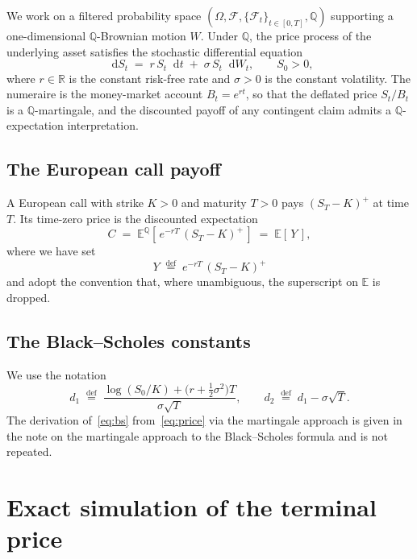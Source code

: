 \documentclass[11pt,a4paper]{article}
\theoremstyle{plain}
\theoremstyle{definition}
\theoremstyle{remark}
\newcommand{\R}{\mathbb{R}}
\newcommand{\E}{\mathbb{E}}
\newcommand{\F}{\mathcal{F}}
\newcommand{\Q}{\mathbb{Q}}
\newcommand{\dd}{\mathop{}\!\mathrm{d}}
\newcommand{\eqdef}{\overset{\mathrm{def}}{=}}
\begin{document}
We work on a filtered probability space
$(\Omega, \F, \{\F_t\}_{t \in [0,T]}, \Q)$ supporting a one-dimensional
$\Q$-Brownian motion $W$. Under $\Q$, the price process of the
underlying asset satisfies the stochastic differential equation
\begin{equation}
\label{eq:gbm-sde}
\dd S_t \;=\; r\, S_t \dd t \;+\; \sigma\, S_t \dd W_t,
\qquad S_0 > 0,
\end{equation}
where $r \in \R$ is the constant risk-free rate and $\sigma > 0$ is the
constant volatility. The numeraire is the money-market account
$B_t = e^{rt}$, so that the deflated price $S_t / B_t$ is a
$\Q$-martingale, and the discounted payoff of any contingent claim
admits a $\Q$-expectation interpretation.

\subsection{The European call payoff}

A European call with strike $K > 0$ and maturity $T > 0$ pays
$(S_T - K)^+$ at time $T$. Its time-zero price is the
discounted expectation
\begin{equation}
\label{eq:price}
C \;=\; \E^{\Q}\!\left[\, e^{-rT}\,(S_T - K)^+ \,\right]
\;=\; \E[\, Y \,],
\end{equation}
where we have set
\begin{equation}
\label{eq:Y-defn}
Y \;\eqdef\; e^{-rT}\,(S_T - K)^+
\end{equation}
and adopt the convention that, where unambiguous, the superscript on
$\E$ is dropped.

\subsection{The Black--Scholes constants}

We use the notation
\begin{equation}
\label{eq:d1d2}
d_1 \;\eqdef\;
\frac{\log(S_0/K) + \big(r + \tfrac{1}{2}\sigma^2\big)T}{\sigma\sqrt{T}},
\qquad
d_2 \;\eqdef\; d_1 - \sigma\sqrt{T}.
\end{equation}
The derivation of~\eqref{eq:bs} from~\eqref{eq:price} via the martingale
approach is given in the note on the martingale approach to the
Black--Scholes formula and is not repeated.

\section{Exact simulation of the terminal price}
\label{sec:exact}
\end{document}
